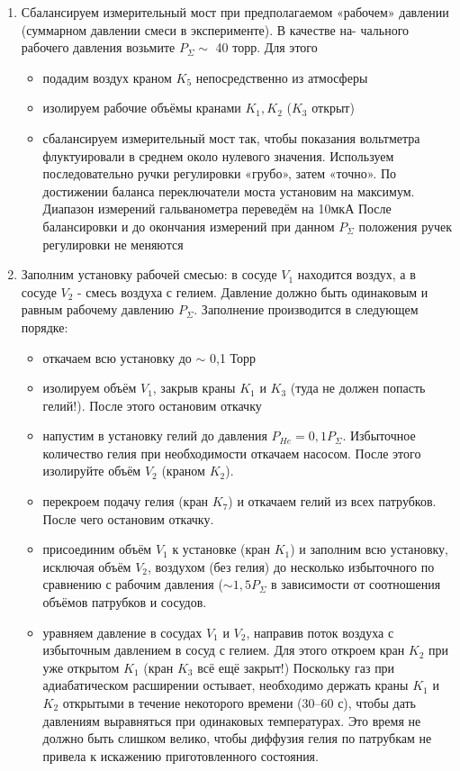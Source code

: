 \documentclass[12pt,a4paper]{article}
\begin{document}
\begin{enumerate}
\item Сбалансируем измерительный мост при предполагаемом «рабочем»
давлении (суммарном давлении смеси в эксперименте). В качестве на-
чального рабочего давления возьмите $P_\Sigma \sim$ 40 торр. Для этого
\begin{itemize}
\item подадим воздух краном $K_5$ непосредственно из атмосферы
\item изолируем рабочие объёмы кранами $K_1, K_2$ ($K_3$ открыт)
\item сбалансируем измерительный мост так, чтобы показания вольтметра флуктуировали в среднем около нулевого значения. Используем последовательно ручки регулировки «грубо», затем «точно». По достижении баланса переключатели моста установим на максимум. Диапазон измерений гальванометра переведём на 10мкА После балансировки и до окончания измерений при данном $P_\Sigma$ положения ручек регулировки не меняются
\end{itemize}
\item Заполним установку рабочей смесью: в сосуде $V_1$ находится воздух, а в сосуде $V_2$ - смесь воздуха с гелием. Давление должно быть одинаковым и равным рабочему давлению $P_\Sigma$. Заполнение производится в следующем порядке:
\begin{itemize}
\item откачаем всю установку до $\sim$ 0,1 Торр
\item изолируем объём $V_1$, закрыв краны $K_1$ и $K_3$ (туда не должен попасть гелий!). После этого остановим откачку
\item напустим в установку гелий до давления $P_{He} = 0,1 P_{\Sigma}$. Избыточное количество гелия при необходимости откачаем насосом. После этого изолируйте объём $V_2$ (краном $K_2$).
\item перекроем подачу гелия (кран $K_7$) и откачаем гелий из всех патрубков. После чего остановим откачку.
\item присоединим объём $V_1$ к установке (кран $K_1$) и заполним всю установку, исключая объём $V_2$, воздухом (без гелия) до несколько избыточного по сравнению с рабочим давления ($\sim 1,5 P_{\Sigma} $ в зависимости от соотношения объёмов патрубков и сосудов.
\item уравняем давление в сосудах $V_1$ и $V_2$, направив поток воздуха с избыточным давлением в сосуд с гелием. Для этого откроем кран $K_2$
при уже открытом $K_1$ (кран $K_3$ всё ещё закрыт!) Поскольку газ при адиабатическом расширении остывает, необходимо держать краны $K_1$ и $K_2$ открытыми в течение некоторого времени (30–60 с), чтобы дать давлениям выравняться при одинаковых температурах. Это время не должно быть слишком велико, чтобы диффузия гелия по патрубкам не привела к искажению приготовленного состояния.

\end{itemize}
\end{enumerate}
\end{document}
